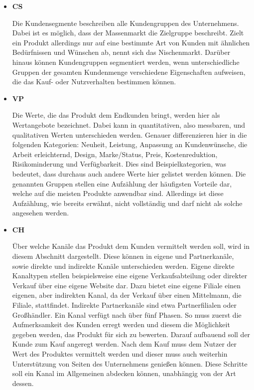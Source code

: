 \begin{itemize}
	\item \textbf{\ac{CS}}
	
	Die Kundensegmente beschreiben alle Kundengruppen des Unternehmens. Dabei ist es möglich, dass der Massenmarkt die Zielgruppe beschreibt. Zielt ein Produkt allerdings nur auf eine bestimmte Art von Kunden mit ähnlichen Bedürfnissen und Wünschen ab, nennt sich das Nischenmarkt. Darüber hinaus können Kundengruppen segmentiert werden, wenn unterschiedliche Gruppen der gesamten Kundenmenge verschiedene Eigenschaften aufweisen, die das Kauf- oder Nutzverhalten bestimmen können. 
	
	\item \textbf{\ac{VP}}
	
	Die Werte, die das Produkt dem Endkunden bringt, werden hier als Wertangebote bezeichnet. Dabei kann in quantitativen, also messbaren, und qualitativen Werten unterschieden werden. Genauer differenzieren \citeauthor{BusinessModelGeneration} hier in die folgenden Kategorien: Neuheit, Leistung, Anpassung an Kundenwünsche, die Arbeit erleichternd, Design, Marke/Status, Preis, Kostenreduktion, Risikominderung und Verfügbarkeit. Dies sind Beispielkategorien, was bedeutet, dass durchaus auch andere Werte hier gelistet werden können. Die genannten Gruppen stellen eine Aufzählung der häufigsten Vorteile dar, welche auf die meisten Produkte anwendbar sind. Allerdings ist diese Aufzählung, wie bereits erwähnt, nicht vollständig und darf nicht als solche angesehen werden. 
	
	\item \textbf{\ac{CH}}
	
	Über welche Kanäle das Produkt dem Kunden vermittelt werden soll, wird in diesem Abschnitt dargestellt. Diese können in eigene und Partnerkanäle, sowie direkte und indirekte Kanäle unterschieden werden. Eigene direkte Kanaltypen stellen beispielsweise eine eigene Verkaufsabteilung oder direkter Verkauf über eine eigene Website dar. Dazu bietet eine eigene Filiale einen eigenen, aber indirekten Kanal, da der Verkauf über einen Mittelmann, die Filiale, stattfindet. Indirekte Partnerkanäle sind etwa Partnerfilialen oder Großhändler. Ein Kanal verfügt nach \citeauthor{BusinessModelGeneration} über fünf Phasen. So muss zuerst die Aufmerksamkeit des Kunden erregt werden und diesem die Möglichkeit gegeben werden, das Produkt für sich zu bewerten. Darauf aufbauend soll der Kunde zum Kauf angeregt werden. Nach dem Kauf muss dem Nutzer der Wert des Produktes vermittelt werden und dieser muss auch weiterhin Unterstützung von Seiten des Unternehmens genießen können. Diese Schritte soll ein Kanal im Allgemeinen abdecken können, unabhängig von der Art dessen.
	

\end{itemize}
